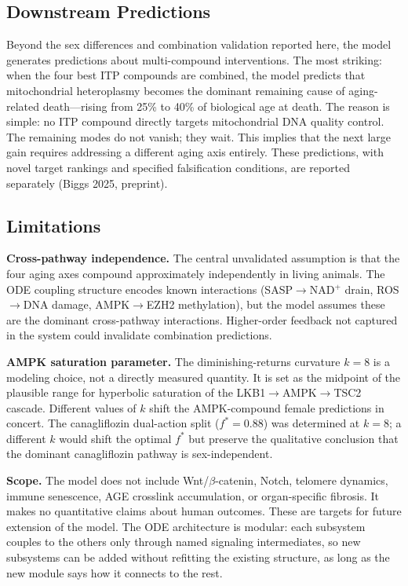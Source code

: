 \documentclass[11pt]{article}
\begin{document}
\subsection{Downstream Predictions}

Beyond the sex differences and combination validation reported here, the model generates predictions about multi-compound interventions. The most striking: when the four best ITP compounds are combined, the model predicts that mitochondrial heteroplasmy becomes the dominant remaining cause of aging-related death---rising from 25\% to 40\% of biological age at death. The reason is simple: no ITP compound directly targets mitochondrial DNA quality control. The remaining modes do not vanish; they wait. This implies that the next large gain requires addressing a different aging axis entirely. These predictions, with novel target rankings and specified falsification conditions, are reported separately (Biggs 2025, preprint).

\subsection{Limitations}

\textbf{Cross-pathway independence.} The central unvalidated assumption is that the four aging axes compound approximately independently in living animals. The ODE coupling structure encodes known interactions (SASP$\to$NAD$^+$ drain, ROS$\to$DNA damage, AMPK$\to$EZH2 methylation), but the model assumes these are the dominant cross-pathway interactions. Higher-order feedback not captured in the system could invalidate combination predictions.

\textbf{AMPK saturation parameter.} The diminishing-returns curvature $k = 8$ is a modeling choice, not a directly measured quantity. It is set as the midpoint of the plausible range for hyperbolic saturation of the LKB1$\to$AMPK$\to$TSC2 cascade. Different values of $k$ shift the AMPK-compound female predictions in concert. The canagliflozin dual-action split ($f^* = 0.88$) was determined at $k = 8$; a different $k$ would shift the optimal $f^*$ but preserve the qualitative conclusion that the dominant canagliflozin pathway is sex-independent.

\textbf{Scope.} The model does not include Wnt/$\beta$-catenin, Notch, telomere dynamics, immune senescence, AGE crosslink accumulation, or organ-specific fibrosis. It makes no quantitative claims about human outcomes. These are targets for future extension of the model. The ODE architecture is modular: each subsystem couples to the others only through named signaling intermediates, so new subsystems can be added without refitting the existing structure, as long as the new module says how it connects to the rest.
\end{document}
